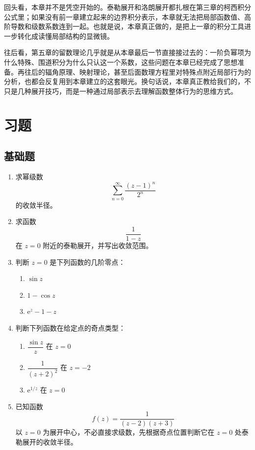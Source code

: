 \begin{tishi}[和前后内容的联系]
回头看，本章并不是凭空开始的。泰勒展开和洛朗展开都扎根在第三章的柯西积分公式里；如果没有前一章建立起来的边界积分表示，本章就无法把局部函数值、高阶导数和级数系数连到一起。也就是说，本章真正做的，是把上一章的积分工具进一步转化成读懂局部结构的显微镜。

往后看，第五章的留数理论几乎就是从本章最后一节直接接过去的：一阶负幂项为什么特殊、围道积分为什么只认这一个系数，这些问题在本章已经完成了思想准备。再往后的辐角原理、映射理论，甚至后面数理方程里对特殊点附近局部行为的分析，也都会反复用到本章建立的这套眼光。换句话说，本章真正教给我们的，不只是几种展开技巧，而是一种通过局部表示去理解函数整体行为的思维方式。
\end{tishi}

\section{习题}

\subsection*{基础题}

\begin{enumerate}
    \item 求幂级数
    \[
        \sum_{n=0}^{\infty} \frac{(z-1)^n}{2^n}
    \]
    的收敛半径。

    \item 求函数
    \[
        \frac{1}{1-z}
    \]
    在 $z=0$ 附近的泰勒展开，并写出收敛范围。

    \item 判断 $z=0$ 是下列函数的几阶零点：
    \begin{enumerate}
        \item $\sin z$
        \item $1-\cos z$
        \item $\mathrm{e}^z-1-z$
    \end{enumerate}

    \item 判断下列函数在给定点的奇点类型：
    \begin{enumerate}
        \item $\dfrac{\sin z}{z}$ 在 $z=0$
        \item $\dfrac{1}{(z+2)^2}$ 在 $z=-2$
        \item $\mathrm{e}^{1/z}$ 在 $z=0$
    \end{enumerate}

    \item 已知函数
    \[
        f(z)=\frac{1}{(z-2)(z+3)}
    \]
    以 $z=0$ 为展开中心，不必直接求级数，先根据奇点位置判断它在 $z=0$ 处泰勒展开的收敛半径。
\end{enumerate}

